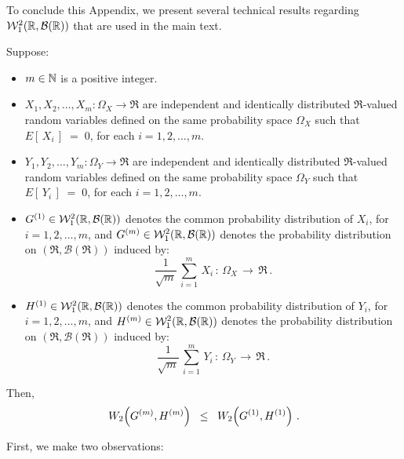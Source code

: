\vskip 0.3cm
\noindent
To conclude this Appendix, we present several technical results regarding $\mathcal{W}^{2}_{1}\!\left(\mathbb{R},\mathcal{B}(\mathbb{R})\right)$
that are used in the main text.

\begin{lemma}
\mbox{}\vskip 0.1cm
\noindent
Suppose:
\begin{itemize}
\item
	$m \in \mathbb{N}$ is a positive integer.
\item
	$X_{1}, X_{2}, \ldots, X_{m} : \Omega_{X} \longrightarrow \Re$
	are independent and identically distributed $\Re$-valued random variables
	defined on the same probability space $\Omega_{X}$ such that
	$E\!\left[\,X_{i}\,\right] \; = \; 0$, for each $i = 1, 2, \ldots, m$.

\item
	$Y_{1}, Y_{2}, \ldots, Y_{m} : \Omega_{Y} \longrightarrow \Re$
	are independent and identically distributed $\Re$-valued random variables
	defined on the same probability space $\Omega_{Y}$ such that
	$E\!\left[\,Y_{i}\,\right] \; = \; 0$, for each $i = 1, 2, \ldots, m$.
\item
	$G^{(1)} \in \mathcal{W}^{2}_{1}\!\left(\mathbb{R},\mathcal{B}(\mathbb{R})\right)$ denotes the common probability distribution of $X_{i}$, for $i = 1, 2, \ldots, m$, and
	$G^{(m)} \in \mathcal{W}^{2}_{1}\!\left(\mathbb{R},\mathcal{B}(\mathbb{R})\right)$ denotes the probability distribution
	on $(\Re,\mathcal{B}(\Re))$ induced by:
	\begin{equation*}
	\dfrac{1}{\sqrt{m}}\,\sum^{m}_{i=1}\,X_{i}\,:\,\Omega_{X}\,\longrightarrow\,\Re\,.
	\end{equation*}
\item
	$H^{(1)} \in \mathcal{W}^{2}_{1}\!\left(\mathbb{R},\mathcal{B}(\mathbb{R})\right)$ denotes the common probability distribution of $Y_{i}$, for $i = 1, 2, \ldots, m$, and
	$H^{(m)} \in \mathcal{W}^{2}_{1}\!\left(\mathbb{R},\mathcal{B}(\mathbb{R})\right)$ denotes the probability distribution
	on $(\Re,\mathcal{B}(\Re))$ induced by:
	\begin{equation*}
	\dfrac{1}{\sqrt{m}}\,\sum^{m}_{i=1}\,Y_{i}\,:\,\Omega_{Y}\,\longrightarrow\,\Re\,.
	\end{equation*}
\end{itemize}
Then,
\begin{equation*}
W_{2}\!\left(G^{(m)},H^{(m)}\right)
\;\;\leq\;\;
W_{2}\!\left(G^{(1)},H^{(1)}\right)\,.
\end{equation*}
\end{lemma}

\proof
First, we make two observations:

